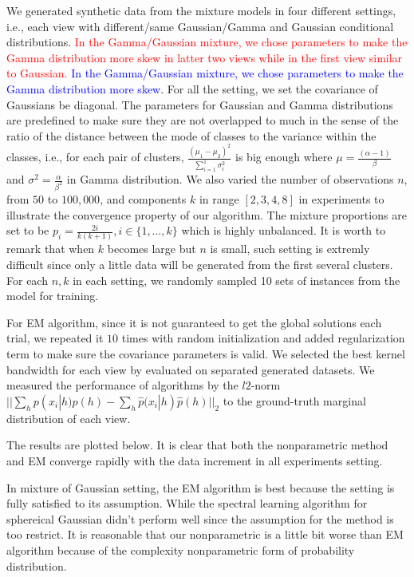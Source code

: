 \documentclass[11pt]{article}
\begin{document}
We generated synthetic data from the mixture models in four different settings, i.e., each view with different/same Gaussian/Gamma and Gaussian conditional distributions.  \textcolor{red}{In the Gamma/Gaussian mixture, we chose parameters to make the Gamma distribution more skew in latter two views while in the first view similar to Gaussian.} \textcolor{blue}{In the Gamma/Gaussian mixture, we chose parameters to make the Gamma distribution more skew}. For all the setting, we set the covariance of Gaussians be diagonal. The parameters for Gaussian and Gamma distributions are predefined to make sure they are not overlapped to much in the sense of the ratio of the distance between the mode of classes to the variance within the classes, i.e., for each pair of clusters, $\frac{(\mu_1 - \mu_2)^2}{\sum_{i = 1}^1\sigma_i^2}$ is big enough where $\mu = \frac{(\alpha-1)}{\beta}$ and $\sigma^2 = \frac{\alpha}{\beta^2}$ in Gamma distribution. We also varied the number of observations $n$, from $50$ to $100, 000$,  and components $k$ in range $[2,3,4,8]$ in experiments to illustrate the convergence property of our algorithm. The mixture proportions are set to be $p_i = \frac{2i}{k(k+1)}, i\in\{1, \ldots, k\}$ which is highly unbalanced. It is worth to remark that when $k$ becomes large but $n$ is small, such setting is extremly difficult since only a little data will be generated from the first several clusters. For each $n,k$ in each setting, we randomly sampled 10 sets of instances from the model for training.

For EM algorithm, since it is not guaranteed to get the global solutions each trial, we repeated it $10$ times with random initialization and added regularization term to make sure the covariance parameters is valid. We selected the best kernel bandwidth for each view by evaluated on separated generated datasets. We measured the performance of algorithms by the $l2$-norm $||\sum_h p(x_i|h)p(h) - \sum_h\hat{p}(x_i|h)\hat{p}(h)||_2$ to the ground-truth marginal distribution of each view. 

The results are plotted below. It is clear that both the nonparametric method and EM converge rapidly with the data increment in all experiments setting. 

In mixture of Gaussian setting, the EM algorithm is best because the setting is fully satisfied to its assumption. While the spectral learning algorithm for sphereical Gaussian didn't perform well since the assumption for the method is too restrict. It is reasonable that our nonparametric is a little bit worse than EM algorithm because of the complexity nonparametric form of probability distribution.
\end{document}
